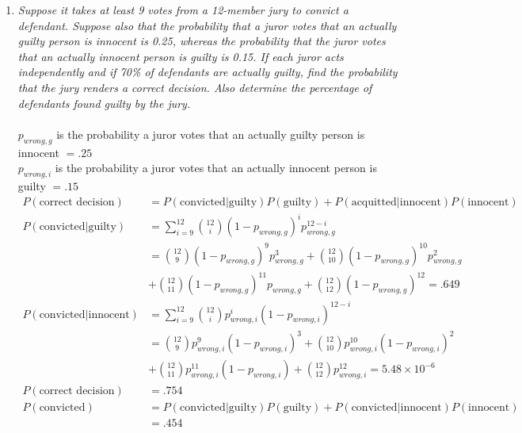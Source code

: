 \documentclass{article} %
\begin{document}
\begin{enumerate}
	\item \textit{Suppose it takes at least 9 votes from a 12-member jury to convict a defendant. Suppose also that the probability that a juror votes that an actually guilty person is innocent is 0.25, whereas the probability that the juror votes that an actually innocent person is guilty is 0.15. If each juror acts independently and if 70\% of defendants are actually guilty, find the probability that the jury renders a correct decision. Also determine the percentage of defendants found guilty by the jury.}\\
	\\
	$p_{wrong,g}$ is the probability a juror votes that an actually guilty person is innocent $= .25$\\
	$p_{wrong,i}$ is the probability a juror votes that an actually innocent person is guilty $= .15$
	\begin{align*}
	P(\text{correct decision}) &= P(\text{convicted}|\text{guilty})P(\text{guilty}) + P(\text{acquitted}|\text{innocent})P(\text{innocent})\\
	P(\text{convicted}|\text{guilty}) &= \sum_{i=9}^{12} \binom{12}{i} (1 - p_{wrong,g})^ip_{wrong,g}^{12-i}\\
	&= \binom{12}{9}(1 - p_{wrong,g})^9p_{wrong,g}^3 + \binom{12}{10}(1 - p_{wrong,g})^{10}p_{wrong,g}^2\\
	&+ \binom{12}{11}(1 - p_{wrong,g})^{11}p_{wrong,g} + \binom{12}{12}(1 - p_{wrong,g})^{12} = .649\\
	P(\text{convicted}|\text{innocent}) &= \sum_{i=9}^{12} \binom{12}{i} p_{wrong,i}^i(1 - p_{wrong,i})^{12-i}\\
	&= \binom{12}{9} p_{wrong,i}^9(1 - p_{wrong,i})^3 + \binom{12}{10} p_{wrong,i}^{10}(1 - p_{wrong,i})^2\\
	&+ \binom{12}{11} p_{wrong,i}^{11}(1 - p_{wrong,i}) + \binom{12}{12} p_{wrong,i}^{12} = 5.48 \times 10^{-6}\\
	P(\text{correct decision}) &= .754\\
	P(\text{convicted}) &= P(\text{convicted}|\text{guilty})P(\text{guilty}) + P(\text{convicted}|\text{innocent})P(\text{innocent})\\
	&= .454
	\end{align*}
	

\end{enumerate}
\end{document}
